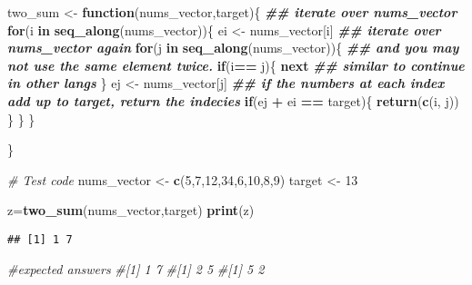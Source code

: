 \documentclass[
]{article}
\newenvironment{Shaded}{\begin{snugshade}}{\end{snugshade}}
\newcommand{\CommentTok}[1]{\textcolor[rgb]{0.56,0.35,0.01}{\textit{#1}}}
\newcommand{\ControlFlowTok}[1]{\textcolor[rgb]{0.13,0.29,0.53}{\textbf{#1}}}
\newcommand{\DecValTok}[1]{\textcolor[rgb]{0.00,0.00,0.81}{#1}}
\newcommand{\DocumentationTok}[1]{\textcolor[rgb]{0.56,0.35,0.01}{\textbf{\textit{#1}}}}
\newcommand{\FunctionTok}[1]{\textcolor[rgb]{0.13,0.29,0.53}{\textbf{#1}}}
\newcommand{\NormalTok}[1]{#1}
\newcommand{\OtherTok}[1]{\textcolor[rgb]{0.56,0.35,0.01}{#1}}
\newcommand{\SpecialCharTok}[1]{\textcolor[rgb]{0.81,0.36,0.00}{\textbf{#1}}}
\begin{document}
\begin{Shaded}
\begin{Highlighting}[]
\NormalTok{two\_sum }\OtherTok{\textless{}{-}} \ControlFlowTok{function}\NormalTok{(nums\_vector,target)\{}
  \DocumentationTok{\#\# iterate over nums\_vector}
  \ControlFlowTok{for}\NormalTok{(i }\ControlFlowTok{in} \FunctionTok{seq\_along}\NormalTok{(nums\_vector))\{}
\NormalTok{    ei }\OtherTok{\textless{}{-}}\NormalTok{ nums\_vector[i]}
    \DocumentationTok{\#\# iterate over nums\_vector again}
    \ControlFlowTok{for}\NormalTok{(j }\ControlFlowTok{in} \FunctionTok{seq\_along}\NormalTok{(nums\_vector))\{}
      \DocumentationTok{\#\# and you may not use the same element twice.}
      \ControlFlowTok{if}\NormalTok{(i}\SpecialCharTok{==}\NormalTok{ j)\{}
        \ControlFlowTok{next} \DocumentationTok{\#\# similar to \textasciigrave{}continue\textasciigrave{} in other langs}
\NormalTok{      \}}
\NormalTok{      ej }\OtherTok{\textless{}{-}}\NormalTok{ nums\_vector[j]}
      \DocumentationTok{\#\# if the numbers at each index add up to target, return the indecies}
      \ControlFlowTok{if}\NormalTok{(ej }\SpecialCharTok{+}\NormalTok{ ei }\SpecialCharTok{==}\NormalTok{ target)\{}
        \FunctionTok{return}\NormalTok{(}\FunctionTok{c}\NormalTok{(i, j))}
\NormalTok{      \}}
\NormalTok{    \}}
\NormalTok{  \}}
 
\NormalTok{\}}


\CommentTok{\# Test code}
\NormalTok{nums\_vector }\OtherTok{\textless{}{-}} \FunctionTok{c}\NormalTok{(}\DecValTok{5}\NormalTok{,}\DecValTok{7}\NormalTok{,}\DecValTok{12}\NormalTok{,}\DecValTok{34}\NormalTok{,}\DecValTok{6}\NormalTok{,}\DecValTok{10}\NormalTok{,}\DecValTok{8}\NormalTok{,}\DecValTok{9}\NormalTok{)}
\NormalTok{target }\OtherTok{\textless{}{-}} \DecValTok{13}
 
\NormalTok{z}\OtherTok{=}\FunctionTok{two\_sum}\NormalTok{(nums\_vector,target)}
\FunctionTok{print}\NormalTok{(z)}
\end{Highlighting}
\end{Shaded}

\begin{verbatim}
## [1] 1 7
\end{verbatim}

\begin{Shaded}
\begin{Highlighting}[]
\CommentTok{\#expected answers}
\CommentTok{\#[1] 1 7}
\CommentTok{\#[1] 2 5}
\CommentTok{\#[1] 5 2}
\end{Highlighting}
\end{Shaded}
\end{document}
